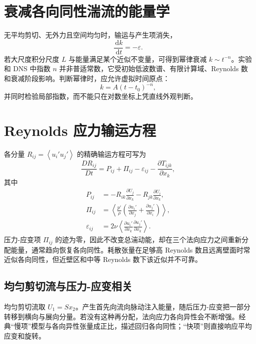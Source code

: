 \documentclass[12pt,a4paper,openany,fontset=none]{ctexbook}
\newcommand{\dd}{\,\mathrm d}
\newcommand{\avg}[1]{\left\langle #1\right\rangle}
\begin{document}
\section{衰减各向同性湍流的能量学}

无平均剪切、无外力且空间均匀时，输运与产生项消失，
\begin{equation}
 \frac{\dd k}{\dd t}=-\varepsilon.
\end{equation}
若大尺度积分尺度 $L$ 与能量满足某个近似不变量，可得到幂律衰减 $k\sim t^{-n}$。实验和 DNS 中指数 $n$ 并非普适常数，它受初始低波数谱、有限计算域、Reynolds 数和衰减阶段影响。判断幂律时，应允许虚拟时间原点：
\begin{equation}
 k=A(t-t_0)^{-n},
\end{equation}
并同时检验局部指数，而不能只在对数坐标上凭直线外观判断。

\section{Reynolds 应力输运方程}

各分量 $R_{ij}=\avg{u_i'u_j'}$ 的精确输运方程可写为
\begin{equation}
 \frac{DR_{ij}}{Dt}=P_{ij}+\Pi_{ij}-\varepsilon_{ij}
 -\frac{\partial T_{ijk}}{\partial x_k},
\end{equation}
其中
\begin{align}
 P_{ij}&=-R_{ik}\frac{\partial U_j}{\partial x_k}
         -R_{jk}\frac{\partial U_i}{\partial x_k},\\
 \Pi_{ij}&=\avg{\frac{p'}{\rho}
 \left(\frac{\partial u_i'}{\partial x_j}+\frac{\partial u_j'}{\partial x_i}\right)},\\
 \varepsilon_{ij}&=2\nu\avg{\frac{\partial u_i'}{\partial x_k}
                                  \frac{\partial u_j'}{\partial x_k}}.
\end{align}
压力-应变项 $\Pi_{ij}$ 的迹为零，因此不改变总湍动能，却在三个法向应力之间重新分配能量，通常趋向恢复各向同性。耗散张量在足够高 Reynolds 数且远离壁面时常近似各向同性，但近壁区和中等 Reynolds 数下该近似并不可靠。

\subsection{均匀剪切流与压力-应变相关}

均匀剪切流取 $U_1=Sx_2$。产生首先向流向脉动注入能量，随后压力-应变把一部分转移到横向与展向分量。若没有这种再分配，法向应力各向异性会不断增强。经典“慢项”模型与各向异性张量成正比，描述回归各向同性；“快项”则直接响应平均应变和旋转。
\end{document}
